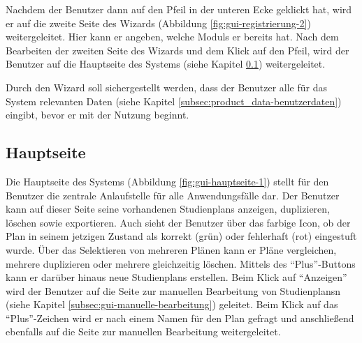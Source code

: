 Nachdem der \gls{Benutzer} dann auf den Pfeil in der unteren Ecke geklickt hat, wird er auf die zweite Seite des \gls{Wizard}s (Abbildung \ref{fig:gui-registrierung-2}) weitergeleitet. Hier kann er angeben, welche \glspl{Modul} er bereits  hat. 
Nach dem Bearbeiten der zweiten Seite des \gls{Wizard}s und dem Klick auf den Pfeil, wird der \gls{Benutzer} auf die Hauptseite des Systems (siehe Kapitel \ref{subsec:gui-hauptseite}) weitergeleitet.

Durch den \gls{Wizard} soll sichergestellt werden, dass der \gls{Benutzer} alle für das System relevanten Daten (siehe Kapitel \ref{subsec:product_data-benutzerdaten}) eingibt, bevor er mit der Nutzung beginnt.


\subsection{Hauptseite}
\label{subsec:gui-hauptseite}
Die Hauptseite des Systems (Abbildung \ref{fig:gui-hauptseite-1}) stellt für den \gls{Benutzer} die zentrale Anlaufstelle für alle Anwendungsfälle dar. Der \gls{Benutzer} kann auf dieser Seite seine vorhandenen \glspl{Studienplan} anzeigen, duplizieren, löschen sowie exportieren. Auch sieht der \gls{Benutzer} über das farbige Icon, ob der Plan in seinem jetzigen Zustand als korrekt (grün) oder fehlerhaft (rot) eingestuft wurde. Über das Selektieren von mehreren Plänen kann er Pläne vergleichen, mehrere duplizieren oder mehrere gleichzeitig löschen. Mittels des \enquote{Plus}-Buttons kann er darüber hinaus neue \glspl{Studienplan} erstellen.\newline
Beim Klick auf \enquote{Anzeigen} wird der \gls{Benutzer} auf die Seite zur manuellen Bearbeitung von \glspl{Studienplan}n (siehe Kapitel \ref{subsec:gui-manuelle-bearbeitung}) geleitet. Beim Klick auf das \enquote{Plus}-Zeichen wird er nach einem Namen für den Plan gefragt und anschließend ebenfalls auf die Seite zur manuellen Bearbeitung weitergeleitet.


